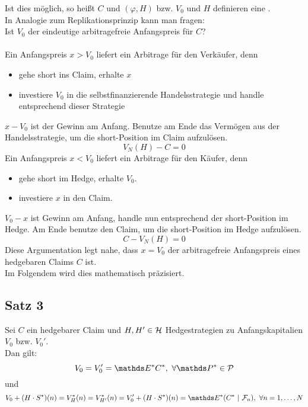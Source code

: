 Ist dies möglich, so heißt $C$  und $(\varphi,H)$ bzw. $V_0$ und $H$ definieren eine .\\
In Analogie zum Replikationsprinzip kann man fragen:\\
Ist $V_0$ der eindeutige arbitragefreie Anfangspreis für $C$?\\
\newpage
{}\\
Ein Anfangspreis $x>V_0$ liefert ein Arbitrage für den Verkäufer, denn 
\begin{itemize}
	\item gehe short ins Claim, erhalte $x$
	\item investiere $V_0$ in die selbstfinanzierende Handelsstrategie und handle entsprechend dieser Strategie
\end{itemize}
$x-V_0$ ist der Gewinn am Anfang.
Benutze am Ende das Vermögen aus der Handelsstrategie, um die short-Position im Claim aufzulösen.
\[
V_N(H)-C=0
\]
Ein Anfangspreis $x<V_0$ liefert ein Arbitrage für den Käufer, denn
\begin{itemize}
	\item gehe short im Hedge, erhalte $V_0$.
	\item investiere $x$ in den Claim.
\end{itemize}
$V_0-x$ ist Gewinn am Anfang, handle nun entsprechend der short-Position im Hedge.
Am Ende benutze den Claim, um die short-Position im Hedge aufzulösen.
\[
C-V_N(H)=0
\]
Diese Argumentation legt nahe, dass $x=V_0$ der arbitragefreie Anfangspreis eines hedgebaren Claims $C$ ist.\\
Im Folgendem wird dies mathematisch präzisiert.

\subsection{Satz 3}
\label{sub:satz_3}
Sei $C$ ein hedgebarer Claim und $H,H'\in \mathcal{H}$ Hedgestrategien zu Anfangskapitalien $V_0$ bzw. $V_0'$.\\
Dan gilt:
\[
V_0=V_0'=\E^*C^*,~\forall \Pw^*\in\mc{P}
\]
und
\[
V_0+(H\cdot S^*)(n)=V_H^*(n)=V_{H'}^*(n)=V_0'+(H\cdot S^*)(n)=\E^*(C^*~|~\F_n),~\forall n=1,\dots,N
\]

